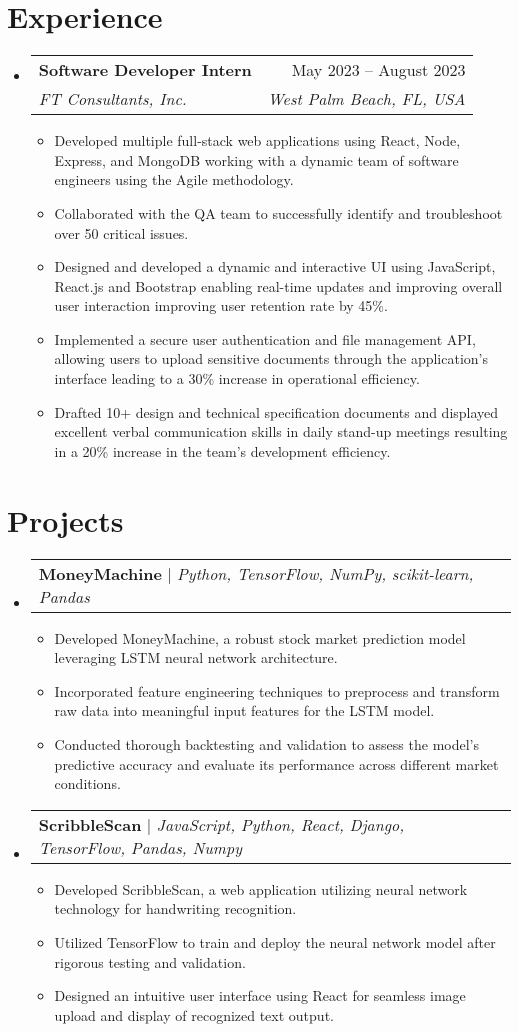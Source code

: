 \documentclass[letterpaper,11pt]{article}
\makeatletter
\newcommand{\resumeItem}[1]{
  \item\small{
    {#1 \vspace{-2pt}}
  }
}
\newcommand{\resumeSubheading}[4]{
  \vspace{-2pt}\item
    \begin{tabular*}{0.97\textwidth}[t]{l@{\extracolsep{\fill}}r}
      \textbf{#1} & #2 \\
      \textit{\small#3} & \textit{\small #4} \\
    \end{tabular*}\vspace{-7pt}
}
\newcommand{\resumeProjectHeading}[2]{
    \item
    \begin{tabular*}{0.97\textwidth}{l@{\extracolsep{\fill}}r}
      \small#1 & #2 \\
    \end{tabular*}\vspace{-7pt}
}
\newcommand{\resumeSubHeadingListStart}{\begin{itemize}[leftmargin=0.15in, label={}]}
\newcommand{\resumeSubHeadingListEnd}{\end{itemize}}
\newcommand{\resumeItemListStart}{\begin{itemize}}
\newcommand{\resumeItemListEnd}{\end{itemize}\vspace{-5pt}}
\makeatother
\begin{document}
\section{Experience}
  \resumeSubHeadingListStart
    \resumeSubheading
      {Software Developer Intern}{May 2023 -- August 2023}
      {FT Consultants, Inc.}{West Palm Beach, FL, USA}
      \resumeItemListStart
        \resumeItem{Developed multiple full-stack web applications using React, Node, Express, and MongoDB working with a dynamic team of software engineers using the Agile methodology.}
        \resumeItem{Collaborated with the QA team to successfully identify and troubleshoot over 50 critical issues.}
        \resumeItem{Designed and developed a dynamic and interactive UI using JavaScript, React.js and Bootstrap enabling real-time updates and improving overall user interaction improving user retention rate by 45\%. }
        \resumeItem{Implemented a secure user authentication and file management API, allowing users to upload sensitive documents through the application's interface leading to a 30\% increase in operational efficiency.}
        \resumeItem{Drafted 10+ design and technical specification documents and displayed excellent verbal communication skills in daily stand-up meetings resulting in a 20\% increase in the team's development efficiency.}
      \resumeItemListEnd
  \resumeSubHeadingListEnd

\section{Projects}
    \resumeSubHeadingListStart
      \resumeProjectHeading
          {\textbf{MoneyMachine} $|$ \emph{Python, TensorFlow, NumPy, scikit-learn, Pandas}}{}
          \resumeItemListStart
            \resumeItem{Developed MoneyMachine, a robust stock market prediction model leveraging LSTM neural network architecture.}
            \resumeItem{Incorporated feature engineering techniques to preprocess and transform raw data into meaningful input features for the LSTM model.}
            \resumeItem{Conducted thorough backtesting and validation to assess the model's predictive accuracy and evaluate its performance across different market conditions.}
          \resumeItemListEnd
      \resumeProjectHeading
          {\textbf{ScribbleScan} $|$ \emph{JavaScript, Python, React, Django, TensorFlow, Pandas, Numpy}}{}
          \resumeItemListStart
            \resumeItem{Developed ScribbleScan, a web application utilizing neural network technology for handwriting recognition.}
            \resumeItem{Utilized TensorFlow to train and deploy the neural network model after rigorous testing and validation.}
            \resumeItem{Designed an intuitive user interface using React for seamless image upload and display of recognized text output.}
          \resumeItemListEnd
    \resumeSubHeadingListEnd
\end{document}
